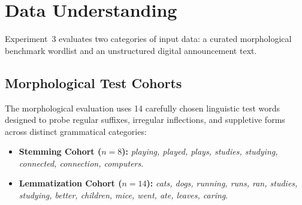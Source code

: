 \documentclass[12pt,a4paper]{report}
\begin{document}
\section{Data Understanding}
Experiment~3 evaluates two categories of input data: a curated morphological benchmark wordlist and an unstructured digital announcement text.

\subsection{Morphological Test Cohorts}
The morphological evaluation uses 14 carefully chosen linguistic test words designed to probe regular suffixes, irregular inflections, and suppletive forms across distinct grammatical categories:
\begin{itemize}
    \item \textbf{Stemming Cohort ($n=8$):} \textit{playing, played, plays, studies, studying, connected, connection, computers}.
    \item \textbf{Lemmatization Cohort ($n=14$):} \textit{cats, dogs, running, runs, ran, studies, studying, better, children, mice, went, ate, leaves, caring}.
\end{itemize}
\end{document}
